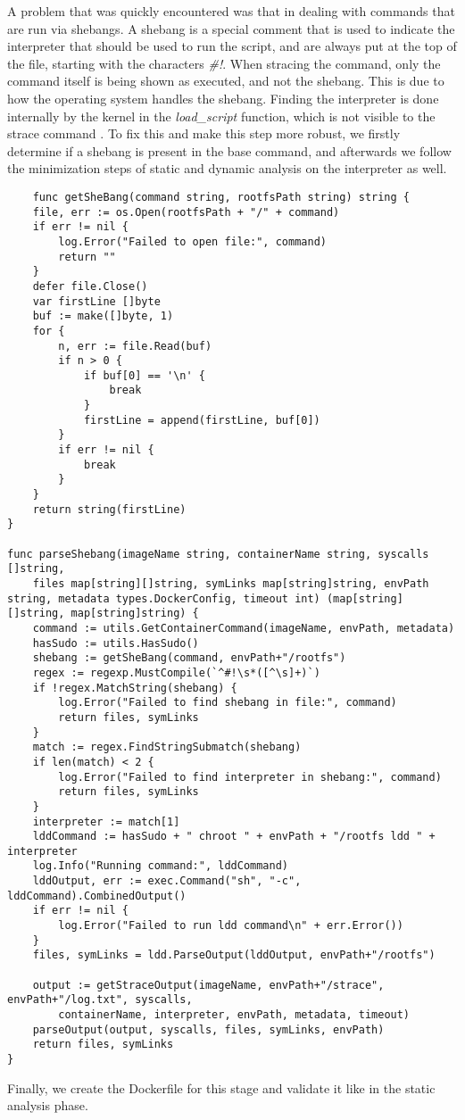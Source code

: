 A problem that was quickly encountered was that in dealing with commands that are run via shebangs.
A shebang is a special comment that is used to indicate the interpreter that should be used to run the script, and are always 
put at the top of the file, starting with the characters \textit{\#!}.
When stracing the command, only the command itself is being shown as executed, and not the shebang. This is due 
to how the operating system handles the shebang. Finding the interpreter is done internally by the kernel in the
\textit{load_script} function, which is not visible to the strace command \cite{demystifying-shebang}. 
To fix this and make this step more robust, we firstly determine if a shebang is present in the base command, and afterwards 
we follow the minimization steps of static and dynamic analysis on the interpreter as well.

\lstset{language=Go,caption=File util functions,label=lst:file-functions}
\begin{lstlisting}
    func getSheBang(command string, rootfsPath string) string {
	file, err := os.Open(rootfsPath + "/" + command)
	if err != nil {
		log.Error("Failed to open file:", command)
		return ""
	}
	defer file.Close()
	var firstLine []byte
	buf := make([]byte, 1)
	for {
		n, err := file.Read(buf)
		if n > 0 {
			if buf[0] == '\n' {
				break
			}
			firstLine = append(firstLine, buf[0])
		}
		if err != nil {
			break
		}
	}
	return string(firstLine)
}

func parseShebang(imageName string, containerName string, syscalls []string,
	files map[string][]string, symLinks map[string]string, envPath string, metadata types.DockerConfig, timeout int) (map[string][]string, map[string]string) {
	command := utils.GetContainerCommand(imageName, envPath, metadata)
	hasSudo := utils.HasSudo()
	shebang := getSheBang(command, envPath+"/rootfs")
	regex := regexp.MustCompile(`^#!\s*([^\s]+)`)
	if !regex.MatchString(shebang) {
		log.Error("Failed to find shebang in file:", command)
		return files, symLinks
	}
	match := regex.FindStringSubmatch(shebang)
	if len(match) < 2 {
		log.Error("Failed to find interpreter in shebang:", command)
		return files, symLinks
	}
	interpreter := match[1]
	lddCommand := hasSudo + " chroot " + envPath + "/rootfs ldd " + interpreter
	log.Info("Running command:", lddCommand)
	lddOutput, err := exec.Command("sh", "-c", lddCommand).CombinedOutput()
	if err != nil {
		log.Error("Failed to run ldd command\n" + err.Error())
	}
	files, symLinks = ldd.ParseOutput(lddOutput, envPath+"/rootfs")

	output := getStraceOutput(imageName, envPath+"/strace", envPath+"/log.txt", syscalls,
		containerName, interpreter, envPath, metadata, timeout)
	parseOutput(output, syscalls, files, symLinks, envPath)
	return files, symLinks
}
\end{lstlisting}

Finally, we create the Dockerfile for this stage and validate it like in the static analysis phase.

